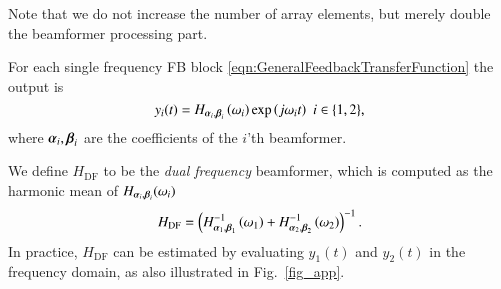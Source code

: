 \par Note that we do not increase the number of array elements, but merely double the beamformer processing part. 
\par For each single frequency FB block \eqref{eqn:GeneralFeedbackTransferFunction} the output is
\[
y_{i}(t)=H_{\vAlpha_{i},\vBeta_{i}}\rBrace{\omega_{i}}\exp{\rBrace{j\omega_{i}t}}\ \ {i\in\cBrace{1,2}},
\]
where $\boldsymbol{\alpha}_{i},\boldsymbol{\beta}_{i}$ are the coefficients of the $i$'th beamformer. 
\par We define $H_{\text{DF}}$ to be the \textit{dual frequency} beamformer, which is computed as the harmonic mean of $H_{\boldsymbol{\alpha}_{i},\boldsymbol{\beta}_{i}}(\omega_i)$ 
\begin{equation*}
    H_{\text{DF}} = \left({H^{-1}_{\boldsymbol{\alpha}_{1},\boldsymbol{\beta}_{1}}\left({\omega_{1}}\right)+H^{-1}_{\boldsymbol{\alpha}_{2},\boldsymbol{\beta}_{2}}\left({\omega_{2}}\right)}\right)^{-1}.
\end{equation*}
In practice, $H_{\text{DF}}$ can be estimated by evaluating $y_1(t)$ and $y_2(t)$ in the frequency domain, as also illustrated in Fig.~\ref{fig_app}.

